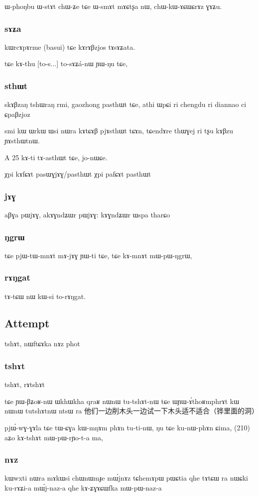 \documentclass[oldfontcommands,oneside,a4paper,11pt]{article}
\begin{document}
ɯ-phoŋbu ɯ-stɤt chɯ-ʑe tɕe ɯ-smɤt mɤɕtʂa nɯ,
chɯ-kɯ-ɤɕɯɕrɤz ɣɤʑu.
\subsubsection{sɤʑa}
kɯrcɤpɤrme (basui) tɕe kɤrɤβzjos tɤsɤʑata.

tɕe kɤ-thu [to-s...] to-sɤʑá-nɯ ɲɯ-ŋu tɕe,
\subsubsection{sthɯt}
skɤβzaŋ tshɯraŋ rmi, gaozhong pasthɯt tɕe, athi ɯpɕi ri 
chengdu ri diannao ci ɕpaβzjoz

smi kɯ ɯrkɯ ɯsi nɯra kɤtɕɤβ pjɤsthɯt tɕɤn,
tɕendɤre thɯɣej ri tʂu kɤβzu ɲɤsthɯtnɯ.

A	25	kɤ-ti	tɤ-asthɯt	tɕe,	jo-nɯɕe.		
 
χpi kɤfɕɤt pasɯɣjɤɣ/pasthɯt
χpi pafɕɤt pasthɯt
\subsubsection{jɤɣ}
aβɣa pɯjɤɣ, akɤɣndʑɯr pɯjɤɣ: kɤɣndʑɯr ɯspa tharɕo

\subsubsection{ŋgrɯ}

tɕe pjɯ-tɯ-mnɤt mɤ-jɤɣ ɲɯ-ti tɕe, 
tɕe kɤ-mnɤt mɯ-pɯ-ŋgrɯ,
\subsubsection{rɤŋgat}
tɤ-tɕɯ nɯ kɯ-si to-rɤŋgat.

\subsection{Attempt}
tshɤt,  nɯftɕɤka
nɤz
phot

\subsubsection{tshɤt}
tshɤt, rɤtshɤt

tɕe ɲɯ-βʑoʁ-nɯ ɯkhɯkha qraʁ nɯnɯ tu-tshɤt-nɯ tɕe
ɯɲɯ-ɤ́thoʁmphrɤt kɯ nɯnɯ tutshɤtnɯ ntsɯ ra
他们一边削木头一边试一下木头适不适合（铧里面的洞）

pjɯ́-wɣ-ɣɤla tɕe tɯ-ɕɣa kɯ-mŋɤm phɤn tu-ti-nɯ,
ŋu tɕe ku-nɯ-phɤn ɕima,  (210)
aʑo kɤ-tshɤt mɯ-pɯ-rɲo-t-a ma,
\subsubsection{nɤz}
kɯwxti nɯra mɤkɯsi chɯnɯmɟe mɯ́jnɤz
tɕhemɤpɯ pɯɕtia qhe tɤtɕɯ ra nɯɕki ku-rɤʑi-a mɯ́j-naz-a qhe
kɤ-ʑɣɤɕɯfka mɯ-pɯ-naz-a
\end{document}
